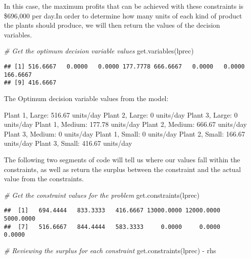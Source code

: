 \documentclass[
]{article}
\newenvironment{Shaded}{\begin{snugshade}}{\end{snugshade}}
\newcommand{\CommentTok}[1]{\textcolor[rgb]{0.56,0.35,0.01}{\textit{#1}}}
\newcommand{\FunctionTok}[1]{\textcolor[rgb]{0.00,0.00,0.00}{#1}}
\newcommand{\NormalTok}[1]{#1}
\newcommand{\SpecialCharTok}[1]{\textcolor[rgb]{0.00,0.00,0.00}{#1}}
\begin{document}
In this case, the maximum profits that can be achieved with these
constraints is \$696,000 per day.In order to determine how many units of
each kind of product the plants should produce, we will then return the
values of the decision variables.

\begin{Shaded}
\begin{Highlighting}[]
\CommentTok{\# Get the optimum decision variable values}
\FunctionTok{get.variables}\NormalTok{(lprec)}
\end{Highlighting}
\end{Shaded}

\begin{verbatim}
## [1] 516.6667   0.0000   0.0000 177.7778 666.6667   0.0000   0.0000 166.6667
## [9] 416.6667
\end{verbatim}

The Optimum decision variable values from the model:

Plant 1, Large: 516.67 units/day Plant 2, Large: 0 units/day Plant 3,
Large: 0 units/day Plant 1, Medium: 177.78 units/day Plant 2, Medium:
666.67 units/day Plant 3, Medium: 0 units/day Plant 1, Small: 0
units/day Plant 2, Small: 166.67 units/day Plant 3, Small: 416.67
units/day

The following two segments of code will tell us where our values fall
within the constraints, as well as return the surplus between the
constraint and the actual value from the constraints.

\begin{Shaded}
\begin{Highlighting}[]
\CommentTok{\# Get the constraint values for the problem}
\FunctionTok{get.constraints}\NormalTok{(lprec)}
\end{Highlighting}
\end{Shaded}

\begin{verbatim}
##  [1]   694.4444   833.3333   416.6667 13000.0000 12000.0000  5000.0000
##  [7]   516.6667   844.4444   583.3333     0.0000     0.0000     0.0000
\end{verbatim}

\begin{Shaded}
\begin{Highlighting}[]
\CommentTok{\# Reviewing the surplus for each constraint}
\FunctionTok{get.constraints}\NormalTok{(lprec) }\SpecialCharTok{{-}}\NormalTok{ rhs}
\end{Highlighting}
\end{Shaded}
\end{document}
